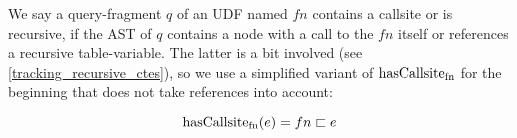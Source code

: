 
We say a query-fragment $q$ of an UDF named $fn$ contains a callsite or is recursive, if the AST of $q$ contains a node with a call to the $fn$ itself or references a recursive table-variable. The latter is a bit involved (see \autoref{tracking_recursive_ctes}), so we use a simplified variant of $\operatorname{\text{hasCallsite}_{fn}}$ for the beginning that does not take references into account:

$$\operatorname{\text{hasCallsite}_{fn}}(e) = fn \sqsubset e$$





